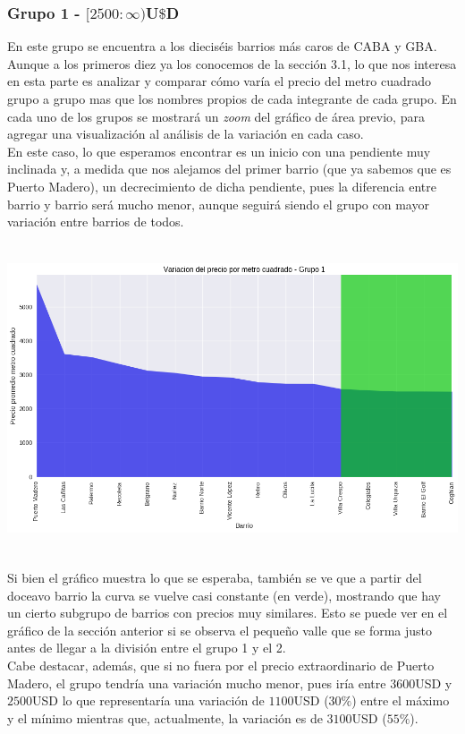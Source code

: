 \documentclass[a4paper, 10pt]{article}
\newcommand\tab[1][0.5cm]{\hspace*{#1}}
\begin{document}
				\subsubsection{Grupo 1 - $[2500:\infty)$U$\$$D}
					En este grupo se encuentra a los dieciséis barrios más caros de CABA y GBA. Aunque a los primeros diez ya los
					conocemos de la sección 3.1, lo que nos interesa en esta parte es analizar y comparar cómo varía el precio
					del metro cuadrado grupo a grupo mas que los nombres propios de cada integrante de cada grupo. En cada uno
					de los grupos se mostrará un \emph{zoom} del gráfico de área previo, para agregar una visualización al
					análisis de la variación en cada caso. \\
					\tab En este caso, lo que esperamos encontrar es un inicio con una pendiente muy inclinada y, a medida que
					nos alejamos del primer barrio (que ya sabemos que es Puerto Madero), un decrecimiento de dicha pendiente,
					pues la diferencia entre barrio y barrio será mucho menor, aunque seguirá siendo el grupo con mayor variación
					entre barrios de todos.
					\begin{center}
   		    				\includegraphics[width=6in, height=3.6in]{images/m2Group1Area}
				  	\end{center}
				  	\tab Si bien el gráfico muestra lo que se esperaba, también se ve que a partir del doceavo barrio la curva
				  	se vuelve casi constante (en verde), mostrando que hay un cierto subgrupo de barrios con precios muy 
				  	similares. Esto se puede ver en el gráfico de la sección anterior si se observa el pequeño valle que 
				  	se forma justo antes 	de llegar a la división entre el grupo 1 y el 2. \\
				  	\tab Cabe destacar, además, que si no fuera por el precio extraordinario de Puerto Madero, el grupo tendría
				  	una variación mucho menor, pues iría entre $3600$USD y $2500$USD lo que representaría una variación de
				  	$1100$USD ($30\%$) entre el máximo y el mínimo mientras que, actualmente, la variación es de $3100$USD
				  	($55\%$).
\end{document}
